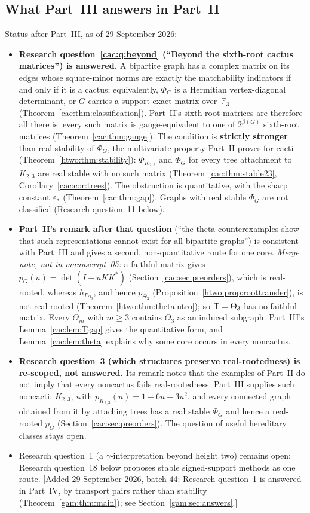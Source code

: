\documentclass[11pt]{article}
\numberwithin{equation}{section}
\theoremstyle{definition}
\newcommand{\F}{\mathbb F}
\newcommand{\epsstar}{\varepsilon_*}
\begin{document}
\subsection{What Part~III answers in Part~II}
\label{cac:sec:answers}
Status after Part~III, as of 29 September 2026:
\begin{itemize}[leftmargin=1.4em]
\item \textbf{Research question~\ref{cac:q:beyond} (``Beyond the sixth-root
cactus matrices'') is answered.} A bipartite graph has a complex matrix on
its edges whose square-minor norms are exactly the matchability indicators
if and only if it is a cactus; equivalently, $\Phi_G$ is a Hermitian
vertex-diagonal determinant, or $G$ carries a support-exact matrix
over~$\F_3$ (Theorem~\ref{cac:thm:classification}). Part~II's sixth-root
matrices are therefore all there is: every such matrix is gauge-equivalent
to one of $2^{\beta(G)}$ sixth-root matrices
(Theorem~\ref{cac:thm:gauge}). The condition is \textbf{strictly stronger}
than real stability of $\Phi_G$, the multivariate property Part~II proves
for cacti (Theorem~\ref{htwo:thm:stability}): $\Phi_{K_{2,3}}$ and $\Phi_G$
for every tree attachment to $K_{2,3}$ are real stable with no such matrix
(Theorem~\ref{cac:thm:stable23}, Corollary~\ref{cac:cor:trees}). The
obstruction is quantitative, with the sharp constant $\epsstar$
(Theorem~\ref{cac:thm:gap}). Graphs with real stable $\Phi_G$ are not
classified (Research question~11 below).
\item \textbf{Part~II's remark after that question} (``the theta
counterexamples show that such representations cannot exist for all
bipartite graphs'') is consistent with Part~III and gives a second,
non-quantitative route for one core. \emph{Merge note, not in
manuscript~05:} a faithful matrix gives $p_G(u)=\det(I+uKK^*)$
(Section~\ref{cac:sec:preorders}), which is real-rooted, whereas
$h_{P_{\Theta_3}}$, and hence $p_{\Theta_3}$
(Proposition~\ref{htwo:prop:roottransfer}), is not real-rooted
(Theorem~\ref{htwo:thm:thetaintro}); so $\mathsf T=\Theta_3$ has no faithful
matrix. Every $\Theta_m$ with $m\ge3$ contains $\Theta_3$ as an induced
subgraph. Part~III's Lemma~\ref{cac:lem:Tgap} gives the quantitative form,
and Lemma~\ref{cac:lem:theta} explains why some core occurs in every
noncactus.
\item \textbf{Research question~3 (which structures preserve
real-rootedness) is re-scoped, not answered.} Its remark notes that the
examples of Part~II do not imply that every noncactus fails
real-rootedness. Part~III supplies such noncacti: $K_{2,3}$, with
$p_{K_{2,3}}(u)=1+6u+3u^2$, and every connected graph obtained from it by
attaching trees has a real stable $\Phi_G$ and hence a real-rooted $p_G$
(Section~\ref{cac:sec:preorders}). The question of useful hereditary
classes stays open.
\item Research question~1 (a $\gamma$-interpretation beyond height two)
remains open; Research question~18 below proposes stable signed-support
methods as one route.
[Added 29 September 2026, batch 44: Research question~1 is answered in
Part~IV, by transport pairs rather than stability
(Theorem~\ref{gam:thm:main}); see Section~\ref{gam:sec:answers}.]
\end{itemize}
\end{document}
